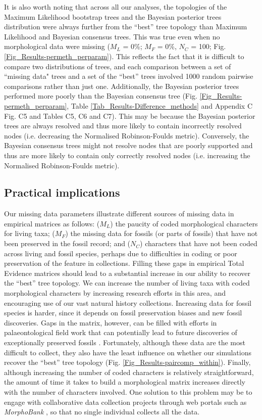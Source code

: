 It is also worth noting that across all our analyses, the topologies of the Maximum Likelihood bootstrap trees and the Bayesian posterior trees distribution were always further from the ``best'' tree topology than Maximum Likelihood and Bayesian consensus trees.
This was true even when no morphological data were missing ($M_{L}$ = 0\%; $M_{F}$ = 0\%, $N_{C}$ = 100; Fig. \ref{Fig_Results-permeth_perparam}).
This reflects the fact that it is difficult to compare two distributions of trees, and each comparison between a set of ``missing data" trees and a set of the ``best'' trees involved 1000 random pairwise comparisons rather than just one.
Additionally, the Bayesian posterior trees performed more poorly than the Bayesian consensus tree (Fig. \ref{Fig_Results-permeth_perparam}, Table \ref{Tab_Results-Difference_methods} and Appendix C Fig. C5 and Tables C5, C6 and C7).
%
%
This may be because the Bayesian posterior trees are always resolved and thus more likely to contain incorrectly resolved nodes (i.e. decreasing the Normalised Robinson-Foulds metric).
Conversely, the Bayesian consensus trees might not resolve nodes that are poorly supported and thus are more likely to contain only correctly resolved nodes (i.e. increasing the Normalised Robinson-Foulds metric).


\subsection{Practical implications}
Our missing data parameters illustrate different sources of missing data in empirical matrices as follows: ($M_{L}$) the paucity of coded morphological characters for living taxa; ($M_{F}$) the missing data for fossils (or parts of fossils) that have not been preserved in the fossil record; and ($N_{C}$) characters that have not been coded across living and fossil species, perhaps due to difficulties in coding or poor preservation of the feature in collections.
Filling these gaps in empirical Total Evidence matrices should lead to a substantial increase in our ability to recover the ``best'' tree topology.
We can increase the number of living taxa with coded morphological characters by increasing research efforts in this area, and encouraging use of our vast natural history collections.
Increasing data for fossil species is harder, since it depends on fossil preservation biases and new fossil discoveries.
Gaps in the matrix, however, can be filled with efforts in palaeontological field work that can potentially lead to future discoveries of exceptionally preserved fossils \citep[e.g.][]{ni2013oldest}.
Fortunately, although these data are the most difficult to collect, they also have the least influence on whether our simulations recover the ``best'' tree topology (Fig. \ref{Fig_Results-paircomp_within}).
Finally, although increasing the number of coded characters is relatively straightforward, the amount of time it takes to build a morphological matrix increases directly with the number of characters involved.
One solution to this problem may be to engage with collaborative data collection projects through web portals such as \textit{MorphoBank} \citep{morphobank}, so that no single individual collects all the data.

